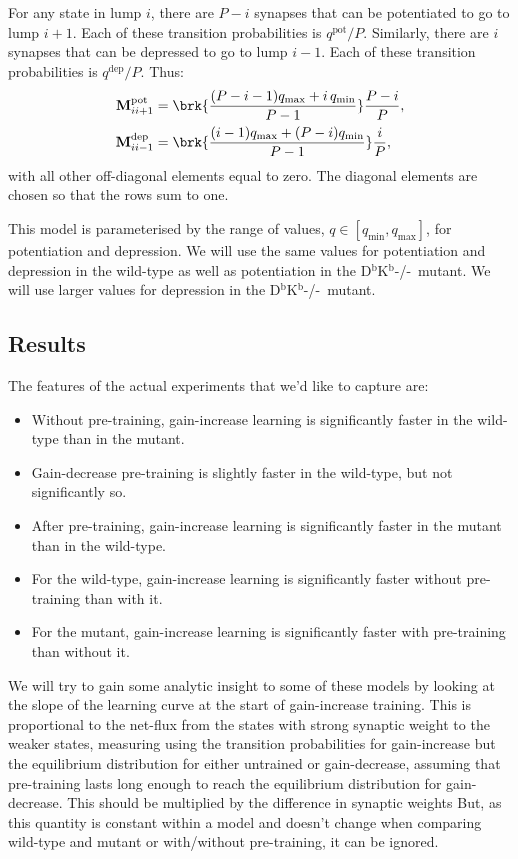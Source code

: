 \documentclass[12pt]{article}
\newcommand{\M}{\mathbf{M}}
\newcommand{\pot}{^{\text{pot}}}
\newcommand{\dep}{^{\text{dep}}}
\newcommand{\KO}{D$^\mathrm{b}$K$^\mathrm{b}$-/-}
\newcommand{\lmax}{_{\text{max}}}
\newcommand{\lmin}{_{\text{min}}}
\begin{document}
For any state in lump $i$, there are $P-i$ synapses that can be potentiated to go to lump $i+1$.
Each of these transition probabilities is $q\pot/P$.
Similarly, there are $i$ synapses that can be depressed to go to lump $i-1$.
Each of these transition probabilities is $q\dep/P$.
Thus:
%
\begin{equation}\label{eq:pooledpotdep}
  \begin{aligned}
    \M\pot_{ii+1} &=  \brk{\frac{(P-i-1)q\lmax + i\,q\lmin}{P-1}} \frac{P-i}{P}, \\
    \M\dep_{ii-1} &=  \brk{\frac{(i-1)q\lmax + (P-i)q\lmin}{P-1}} \frac{i}{P},
  \end{aligned}
\end{equation}
%
with all other off-diagonal elements equal to zero.
The diagonal elements are chosen so that the rows sum to one.

This model is parameterised by the range of values, $q\in[q\lmin,q\lmax]$, for potentiation and depression.
We will use the same values for potentiation and depression in the wild-type as well as potentiation in the \KO\ mutant.
We will use larger values for depression in the \KO\ mutant.


\subsection{Results}\label{sec:results}

The features of the actual experiments that we'd like to capture are:
\begin{itemize}
  \item Without pre-training, gain-increase learning is significantly faster in the wild-type than in the mutant.
  \item Gain-decrease pre-training is slightly faster in the wild-type, but not significantly so.
  \item After pre-training, gain-increase learning is significantly faster in the mutant than in the wild-type.
  \item For the wild-type, gain-increase learning is significantly faster without pre-training than with it.
  \item For the mutant, gain-increase learning is significantly faster with pre-training than without it.
\end{itemize}

We will try to gain some analytic insight to some of these models by looking at the slope of the learning curve at the start of gain-increase training.
This is proportional to the net-flux from the states with strong synaptic weight to the weaker states, measuring using the transition probabilities for gain-increase but the equilibrium distribution for either untrained or gain-decrease, assuming that pre-training lasts long enough to reach the equilibrium distribution for gain-decrease.
This should be multiplied by the difference in synaptic weights 
But, as this quantity is constant within a model and doesn't change when comparing wild-type and mutant or with/without pre-training, it can be ignored.
\end{document}
